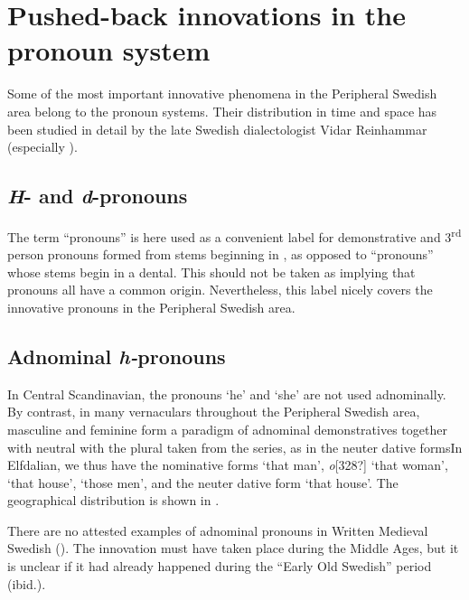 \section{Pushed-back innovations in the pronoun system}

Some of the most important innovative phenomena in the Peripheral Swedish area belong to the pronoun systems. Their distribution in time and space has been studied in detail by the late Swedish dialectologist Vidar Reinhammar (especially \citet{Reinhammar1975}). 

\subsection{\textit{H}{}- and \textit{d}-pronouns}

The term “pronouns” is here used as a convenient label for demonstrative and 3\textsuperscript{rd} person pronouns formed from stems beginning in , as opposed to “pronouns” whose stems begin in a dental. This should not be taken as implying that pronouns all have a common origin. Nevertheless, this label nicely covers the innovative pronouns in the Peripheral Swedish area.

\subsection{Adnominal \textit{h-}pronouns}

In Central Scandinavian, the pronouns  ‘he’ and  ‘she’ are not used adnominally. By contrast, in many vernaculars throughout the Peripheral Swedish area, masculine  and feminine  form a paradigm of adnominal demonstratives together with neutral with the plural taken from the series, as in the neuter dative formsIn Elfdalian, we thus have the nominative forms  ‘that man’, \textit{o}[328?] ‘that woman’,  ‘that house’,  ‘those men’, and the neuter dative form ‘that house’. The geographical distribution is shown in . 

There are no attested examples of adnominal pronouns in Written Medieval Swedish (\citet[114]{Reinhammar1975}). The innovation must have taken place during the Middle Ages, but it is unclear if it had already happened during the “Early Old Swedish” period (ibid.).

